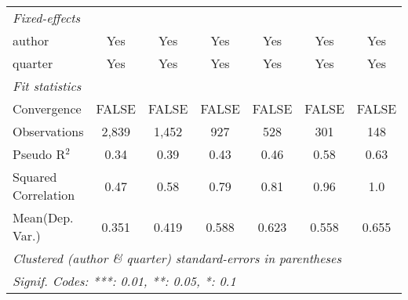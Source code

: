 \begin{tabular}{lcccccc}
   \midrule
   \emph{Fixed-effects}\\
   author                                                     & Yes           & Yes           & Yes           & Yes           & Yes           & Yes\\  
   quarter                                                    & Yes           & Yes           & Yes           & Yes           & Yes           & Yes\\  
   \midrule
   \emph{Fit statistics}\\
   Convergence                                                &FALSE          & FALSE         & FALSE         & FALSE         & FALSE         & FALSE\\  
   Observations                                               & 2,839         & 1,452         & 927           & 528           & 301           & 148\\  
   Pseudo R$^2$                                               & 0.34          & 0.39          & 0.43          & 0.46          & 0.58          & 0.63\\  
   Squared Correlation                                        & 0.47          & 0.58          & 0.79          & 0.81          & 0.96          & 1.0\\  
Mean(Dep. Var.) & 0.351 & 0.419 & 0.588 & 0.623 & 0.558 & 0.655 \\
   \midrule \midrule
   \multicolumn{7}{l}{\emph{Clustered (author \& quarter) standard-errors in parentheses}}\\
   \multicolumn{7}{l}{\emph{Signif. Codes: ***: 0.01, **: 0.05, *: 0.1}}\\
\end{tabular}
\par\endgroup
